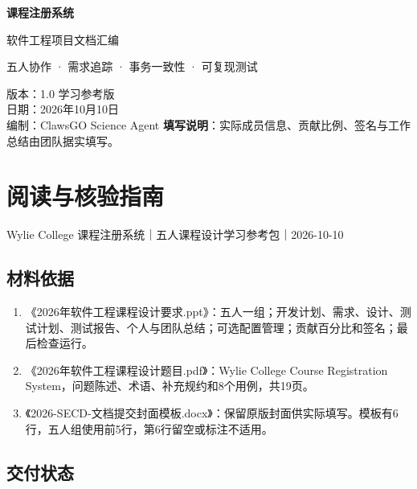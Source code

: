\documentclass[UTF8,11pt,a4paper]{ctexart}
\providecommand{\tightlist}{\setlength{\itemsep}{0pt}\setlength{\parskip}{0pt}}
\begin{document}

\begin{titlepage}\vspace*{2cm}
{\Huge\bfseries 课程注册系统}\par\vspace{0.5cm}
{\LARGE 软件工程项目文档汇编}\par\vspace{1cm}
{\large 五人协作 · 需求追踪 · 事务一致性 · 可复现测试}\par\vspace{1cm}
版本：1.0 学习参考版\\日期：2026年10月10日\\编制：ClawsGO Science Agent
\vfill
\textbf{填写说明}：实际成员信息、贡献比例、签名与工作总结由团队据实填写。
\end{titlepage}\tableofcontents\clearpage
\clearpage
\hypertarget{ux9605ux8bfbux4e0eux6838ux9a8cux6307ux5357}{%
\section{阅读与核验指南}\label{ux9605ux8bfbux4e0eux6838ux9a8cux6307ux5357}}

Wylie College 课程注册系统｜五人课程设计学习参考包｜2026-10-10

\hypertarget{ux6750ux6599ux4f9dux636e}{%
\subsection{材料依据}\label{ux6750ux6599ux4f9dux636e}}

\begin{enumerate}
\def\labelenumi{\arabic{enumi}.}
\tightlist
\item
  《2026年软件工程课程设计要求.ppt》：五人一组；开发计划、需求、设计、测试计划、测试报告、个人与团队总结；可选配置管理；贡献百分比和签名；最后检查运行。
\item
  《2026年软件工程课程设计题目.pdf》：Wylie College Course Registration
  System，问题陈述、术语、补充规约和8个用例，共19页。
\item
  《2026-SECD-文档提交封面模板.docx》：保留原版封面供实际填写。模板有6行，五人组使用前5行，第6行留空或标注不适用。
\end{enumerate}

\hypertarget{ux4ea4ux4ed8ux72b6ux6001}{%
\subsection{交付状态}\label{ux4ea4ux4ed8ux72b6ux6001}}
\end{document}
